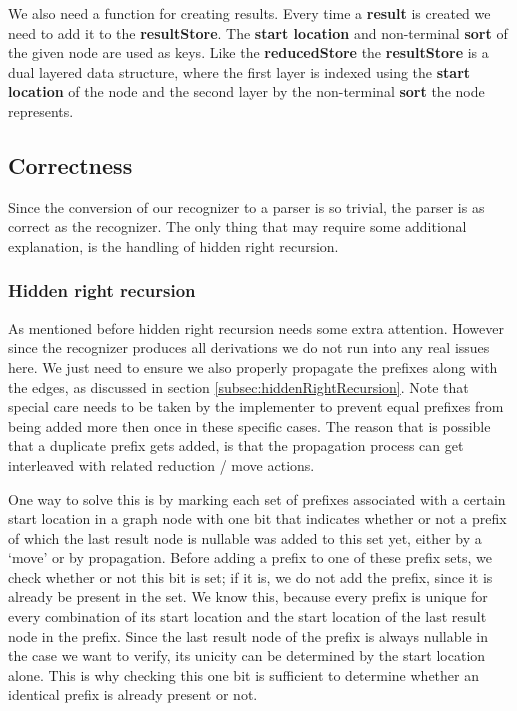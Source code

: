 \documentclass[a4paper,10pt]{article}
\begin{document}
We also need a function for creating results. Every time a {\bf result} is created we need to add it to the {\bf resultStore}. The {\bf start location} and non-terminal {\bf sort} of the given node are used as keys. Like the {\bf reducedStore} the {\bf resultStore} is a dual layered data structure, where the first layer is indexed using the {\bf start location} of the node and the second layer by the non-terminal {\bf sort} the node represents.

\subsection{Correctness}
\label{sec:parserCorrectness}

Since the conversion of our recognizer to a parser is so trivial, the parser is as correct as the recognizer. The only thing that may require some additional explanation, is the handling of hidden right recursion.

\subsubsection{Hidden right recursion}
As mentioned before hidden right recursion needs some extra attention. However since the recognizer produces all derivations we do not run into any real issues here. We just need to ensure we also properly propagate the prefixes along with the edges, as discussed in section \ref{subsec:hiddenRightRecursion}. Note that special care needs to be taken by the implementer to prevent equal prefixes from being added more then once in these specific cases. The reason that is possible that a duplicate prefix gets added, is that the propagation process can get interleaved with related reduction / move actions.

One way to solve this is by marking each set of prefixes associated with a certain start location in a graph node with one bit that indicates whether or not a prefix of which the last result node is nullable was added to this set yet, either by a `move' or by propagation. Before adding a prefix to one of these prefix sets, we check whether or not this bit is set; if it is, we do not add the prefix, since it is already be present in the set. We know this, because every prefix is unique for every combination of its start location and the start location of the last result node in the prefix. Since the last result node of the prefix is always nullable in the case we want to verify, its unicity can be determined by the start location alone. This is why checking this one bit is sufficient to determine whether an identical prefix is already present or not.
\end{document}
